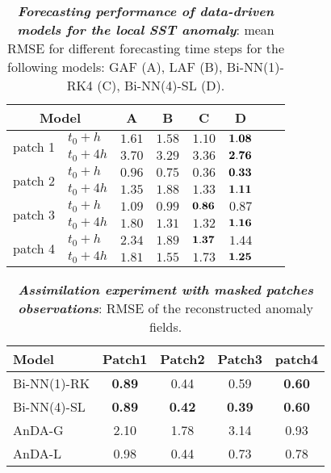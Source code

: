 \documentclass{article}
\begin{document}
\begin{table}[hbpt]
\caption {{\bf  \em Forecasting performance of data-driven models for the local SST anomaly}: mean RMSE for different forecasting time steps for the following models:  GAF (A), LAF (B), Bi-NN(1)-RK4 (C), Bi-NN(4)-SL (D).}
{\footnotesize
\begin{center}
\begin{tabular}{ll*{6}c}
\toprule
\multicolumn{2}{c}{Model} &A & B & C & D \\
\midrule \midrule 
\multirow{2}{*}{patch 1}
&$t_0+h$  & $1.61$ & $1.58$ & $1.10$ & $\bf1.08$\\
&$t_0+4h$ & $3.70$ & $3.29$ & $3.36$ & $\bf2.76$\\                   
\midrule %
\multirow{2}{*}{patch 2}
&$t_0+h$  & $0.96$ & $0.75$ & $0.36$ & $\bf0.33$ \\
&$t_0+4h$ & $1.35$ & $1.88$ & $1.33$ & $\bf1.11$ \\
\midrule %
\multirow{2}{*}{patch 3}
&$t_0+h$  & $1.09$ & $0.99$ & $\bf0.86$ & $0.87$\\
&$t_0+4h$ & $1.80$ & $1.31$ & $1.32$ & $\bf1.16$\\
\midrule %
\multirow{2}{*}{patch 4}
&$t_0+h$  & $2.34$ & $1.89$ & $\bf1.37$ & $1.44$ \\
&$t_0+4h$ & $1.81$ & $1.55$ & $1.73$ & $\bf1.25$ \\
\bottomrule
\end{tabular}
\end{center} }
\label{tab:forec1}
\end{table}




\begin{table}[hbpt]
\caption{{\bf \em{Assimilation experiment with masked patches observations}}: RMSE of the reconstructed anomaly fields.}
{\footnotesize
\begin{center}
\begin{tabular}{l c c c c }
  \hline
  Model             & Patch1& Patch2& Patch3&patch4\\
  \hline
  Bi-NN(1)-RK       & \bf0.89& 0.44 & 0.59 & \bf0.60\\
  \hline
  Bi-NN(4)-SL       & \bf0.89& \bf0.42 & \bf0.39 & \bf0.60\\
   \hline
  AnDA-G			& 2.10& 1.78 & 3.14  & 0.93\\
  \hline
  AnDA-L			& 0.98& 0.44 & 0.73  & 0.78\\
  \hline
\end{tabular}
\end{center} }
\label{tab:assim}
\end{table}
\end{document}
